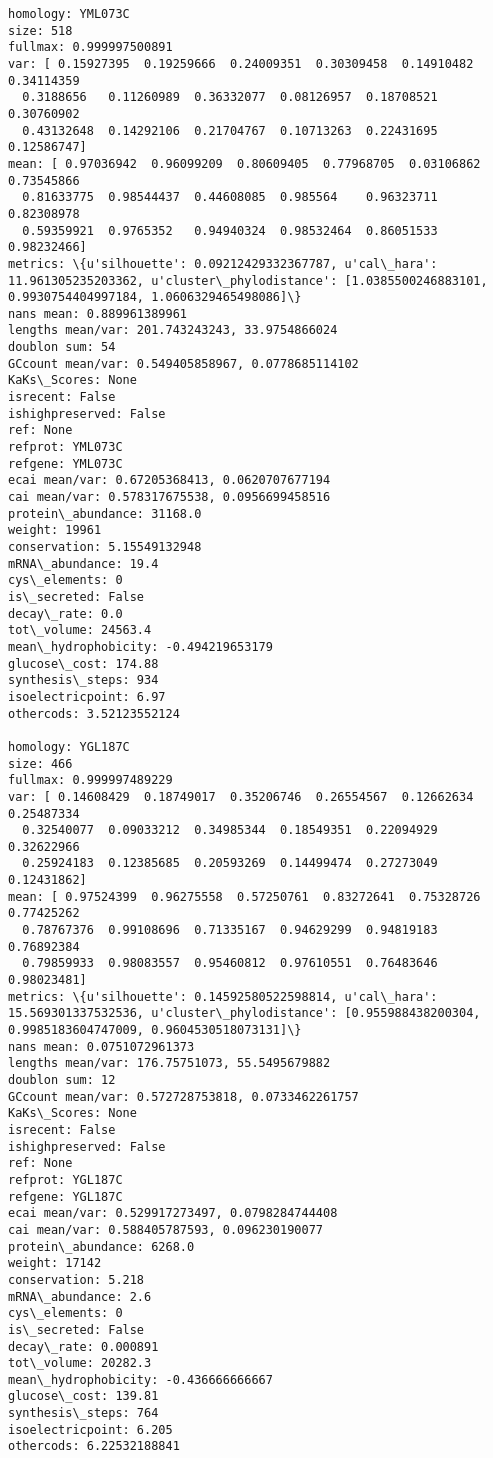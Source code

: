 \documentclass[11pt]{article}
\begin{document}
\begin{Verbatim}[commandchars=\\\{\}]
homology: YML073C
size: 518
fullmax: 0.999997500891
var: [ 0.15927395  0.19259666  0.24009351  0.30309458  0.14910482  0.34114359
  0.3188656   0.11260989  0.36332077  0.08126957  0.18708521  0.30760902
  0.43132648  0.14292106  0.21704767  0.10713263  0.22431695  0.12586747]
mean: [ 0.97036942  0.96099209  0.80609405  0.77968705  0.03106862  0.73545866
  0.81633775  0.98544437  0.44608085  0.985564    0.96323711  0.82308978
  0.59359921  0.9765352   0.94940324  0.98532464  0.86051533  0.98232466]
metrics: \{u'silhouette': 0.09212429332367787, u'cal\_hara': 11.961305235203362, u'cluster\_phylodistance': [1.0385500246883101, 0.9930754404997184, 1.0606329465498086]\}
nans mean: 0.889961389961
lengths mean/var: 201.743243243, 33.9754866024
doublon sum: 54
GCcount mean/var: 0.549405858967, 0.0778685114102
KaKs\_Scores: None
isrecent: False
ishighpreserved: False
ref: None
refprot: YML073C
refgene: YML073C
ecai mean/var: 0.67205368413, 0.0620707677194
cai mean/var: 0.578317675538, 0.0956699458516
protein\_abundance: 31168.0
weight: 19961
conservation: 5.15549132948
mRNA\_abundance: 19.4
cys\_elements: 0
is\_secreted: False
decay\_rate: 0.0
tot\_volume: 24563.4
mean\_hydrophobicity: -0.494219653179
glucose\_cost: 174.88
synthesis\_steps: 934
isoelectricpoint: 6.97
othercods: 3.52123552124

homology: YGL187C
size: 466
fullmax: 0.999997489229
var: [ 0.14608429  0.18749017  0.35206746  0.26554567  0.12662634  0.25487334
  0.32540077  0.09033212  0.34985344  0.18549351  0.22094929  0.32622966
  0.25924183  0.12385685  0.20593269  0.14499474  0.27273049  0.12431862]
mean: [ 0.97524399  0.96275558  0.57250761  0.83272641  0.75328726  0.77425262
  0.78767376  0.99108696  0.71335167  0.94629299  0.94819183  0.76892384
  0.79859933  0.98083557  0.95460812  0.97610551  0.76483646  0.98023481]
metrics: \{u'silhouette': 0.14592580522598814, u'cal\_hara': 15.569301337532536, u'cluster\_phylodistance': [0.955988438200304, 0.9985183604747009, 0.9604530518073131]\}
nans mean: 0.0751072961373
lengths mean/var: 176.75751073, 55.5495679882
doublon sum: 12
GCcount mean/var: 0.572728753818, 0.0733462261757
KaKs\_Scores: None
isrecent: False
ishighpreserved: False
ref: None
refprot: YGL187C
refgene: YGL187C
ecai mean/var: 0.529917273497, 0.0798284744408
cai mean/var: 0.588405787593, 0.096230190077
protein\_abundance: 6268.0
weight: 17142
conservation: 5.218
mRNA\_abundance: 2.6
cys\_elements: 0
is\_secreted: False
decay\_rate: 0.000891
tot\_volume: 20282.3
mean\_hydrophobicity: -0.436666666667
glucose\_cost: 139.81
synthesis\_steps: 764
isoelectricpoint: 6.205
othercods: 6.22532188841


\end{Verbatim}
\end{document}
